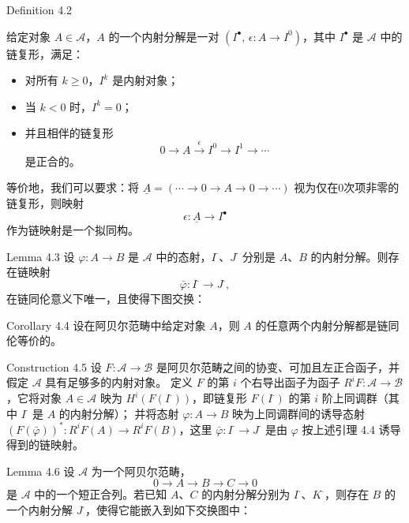 \documentclass{beamer}
\begin{document}
\begin{frame}
\begin{block}{Definition 4.2}

给定对象 $A\in\mathcal{A}$，$A$ 的一个内射分解是一对 $(I^\bullet,\,\epsilon:A\to I^0)$，其中 $I^\bullet$ 是 $\mathcal{A}$ 中的链复形，满足：
\begin{itemize}
    \item 对所有 $k\ge0$，$I^k$ 是内射对象；
    \item 当 $k<0$ 时，$I^k=0$；
    \item 并且相伴的链复形
          \[
          0 \to A \stackrel{\epsilon}{\to} I^0 \to I^1 \to \cdots
          \]
          是正合的。
\end{itemize}

等价地，我们可以要求：将 $\underline{A}=(\cdots\to0\to A\to0\to\cdots)$ 视为仅在0次项非零的链复形，则映射
\[
\epsilon:\underline{A}\to I^\bullet
\]
作为链映射是一个拟同构。
\end{block}
\end{frame}

\begin{frame}
\begin{block}{Lemma 4.3}
设 $\varphi: A \to B$ 是 $\mathcal{A}$ 中的态射，$I^\cdot$、$J^\cdot$ 分别是 $A$、$B$ 的内射分解。则存在链映射
\[
\bar{\varphi}: I^\cdot \to J^\cdot,
\]
在链同伦意义下唯一，且使得下图交换：
\end{block}
\end{frame}

\begin{frame}
\begin{block}{Corollary 4.4}
设在阿贝尔范畴中给定对象 $A$，则 $A$ 的任意两个内射分解都是链同伦等价的。
\end{block}
\begin{block}{Construction 4.5}
设 $F: \mathcal{A} \to \mathcal{B}$ 是阿贝尔范畴之间的协变、可加且左正合函子，并假定 $\mathcal{A}$ 具有足够多的内射对象。
定义 $F$ 的第 $i$ 个右导出函子为函子 $R^i F: \mathcal{A} \to \mathcal{B}$，它将对象 $A \in \mathcal{A}$ 映为 $H^i(F(I^\cdot))$，即链复形 $F(I^\cdot)$ 的第 $i$ 阶上同调群（其中 $I^\cdot$ 是 $A$ 的内射分解）；
并将态射 $\varphi: A \to B$ 映为上同调群间的诱导态射 $(F(\bar{\varphi}))^*: R^i F(A) \to R^i F(B)$，这里 $\bar{\varphi}: I^\cdot \to J^\cdot$ 是由 $\varphi$ 按上述引理 4.4 诱导得到的链映射。
\end{block}
\end{frame}

\begin{frame}
\begin{block}{Lemma 4.6}
设 $\mathcal{A}$ 为一个阿贝尔范畴，
\[
0 \to A \to B \to C \to 0
\]
是 $\mathcal{A}$ 中的一个短正合列。若已知 $A$、$C$ 的内射分解分别为 $I^\cdot$、$K^\cdot$，则存在 $B$ 的一个内射分解 $J^\cdot$，使得它能嵌入到如下交换图中：
\end{block}
\end{frame}
\end{document}

